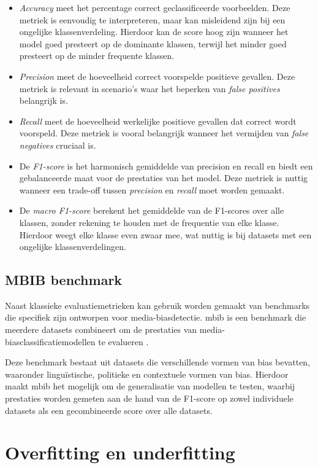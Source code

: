 \begin{itemize}
    \item \textit{Accuracy} meet het percentage correct geclassificeerde voorbeelden. Deze metriek is eenvoudig te interpreteren, maar kan misleidend zijn bij een ongelijke klassenverdeling. Hierdoor kan de score hoog zijn wanneer het model goed presteert op de dominante klassen, terwijl het minder goed presteert op de minder frequente klassen.
    \item \textit{Precision} meet de hoeveelheid correct voorspelde positieve gevallen. Deze metriek is relevant in scenario's waar het beperken van \textit{false positives} belangrijk is.
    \item \textit{Recall} meet de hoeveelheid werkelijke positieve gevallen dat correct wordt voorspeld. Deze metriek is vooral belangrijk wanneer het vermijden van \textit{false negatives} cruciaal is.
    \item De \textit{F1-score} is het harmonisch gemiddelde van precision en recall en biedt een gebalanceerde maat voor de prestaties van het model. Deze metriek is nuttig wanneer een trade-off tussen \textit{precision} en \textit{recall} moet worden gemaakt.
    \item De \textit{macro F1-score} berekent het gemiddelde van de F1-scores over alle klassen, zonder rekening te houden met de frequentie van elke klasse. Hierdoor weegt elke klasse even zwaar mee, wat nuttig is bij datasets met een ongelijke klassenverdelingen.
\end{itemize}

\subsection{MBIB benchmark}

Naast klassieke evaluatiemetrieken kan gebruik worden gemaakt van benchmarks die specifiek zijn ontworpen voor media-biasdetectie. \gls{mbib} is een benchmark die meerdere datasets combineert om de prestaties van media-biasclassificatiemodellen te evalueren \autocite{Wessel2023}.

Deze benchmark bestaat uit datasets die verschillende vormen van bias bevatten, waaronder linguïstische, politieke en contextuele vormen van bias. Hierdoor maakt \gls{mbib} het mogelijk om de generalisatie van modellen te testen, waarbij prestaties worden gemeten aan de hand van de F1-score op zowel individuele datasets als een gecombineerde score over alle datasets.

\section{Overfitting en underfitting}
\label{sec:overfitting-en-underfitting}

